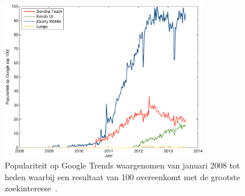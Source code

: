 \begin{figure}
  \centering
  \includegraphics[width=0.8\textwidth]{figuren/google-trends.pdf}
  \caption{Populariteit op Google Trends waargenomen van januari 2008 tot heden waarbij een resultaat van 100 overeenkomt met de grootste zoekinteresse~\cite{Google2012a}.}
  \label{fig:google-trends}
\end{figure}